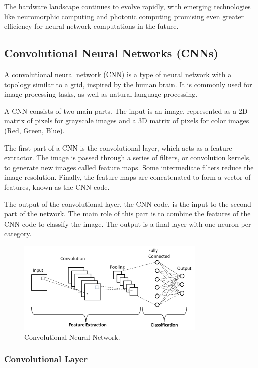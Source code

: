 The hardware landscape continues to evolve rapidly, with emerging technologies like neuromorphic computing and photonic computing promising even greater efficiency for neural network computations in the future.

\subsection{Convolutional Neural Networks (CNNs)}
\label{sec:cnn}
A convolutional neural network (CNN) is a type of neural network with a topology similar to a grid, inspired by the human brain. It is commonly used for image processing tasks, as well as natural language processing.

A CNN consists of two main parts. The input is an image, represented as a 2D matrix of pixels for grayscale images and a 3D matrix of pixels for color images (Red, Green, Blue).

The first part of a CNN is the convolutional layer, which acts as a feature extractor. The image is passed through a series of filters, or convolution kernels, to generate new images called feature maps. Some intermediate filters reduce the image resolution. Finally, the feature maps are concatenated to form a vector of features, known as the CNN code.

The output of the convolutional layer, the CNN code, is the input to the second part of the network. The main role of this part is to combine the features of the CNN code to classify the image. The output is a final layer with one neuron per category.
\begin{figure}[H]
  \centering
  \includegraphics[width=0.8\textwidth]{Images/Chapter1/cnn.png}
  \caption{Convolutional Neural Network.}
  \label{fig:cnn}
\end{figure}

\subsubsection{Convolutional Layer}
\label{sec:conv}


